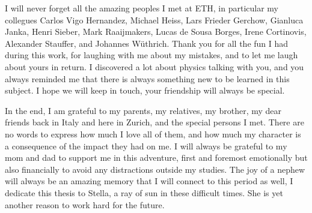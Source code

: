 I will never forget all the amazing peoples I met at ETH, in particular my collegues Carlos Vigo Hernandez, Michael Heiss, Lars Frieder Gerchow, Gianluca Janka, Henri Sieber, Mark Raaijmakers, Lucas de Sousa Borges, Irene Cortinovis, Alexander Stauffer, and Johannes W{\"u}thrich. Thank you for all the fun I had during this work, for laughing with me about my mistakes, and to let me laugh about yours in return. I discovered a lot about physics talking with you, and you always reminded me that there is always something new to be learned in this subject. I hope we will keep in touch, your friendship will always be special.

In the end, I am grateful to my parents, my relatives, my brother, my dear friends back in Italy and here in Zurich, and the special persons I met. There are no words to express how much I love all of them, and how much my character is a consequence of the impact they had on me. I will always be grateful to my mom and dad to support me in this adventure, first and foremost emotionally but also financially to avoid any distractions outside my studies. The joy of a nephew will always be an amazing memory that I will connect to this period as well, I dedicate this thesis to Stella, a ray of sun in these difficult times. She is yet another reason to work hard for the future.